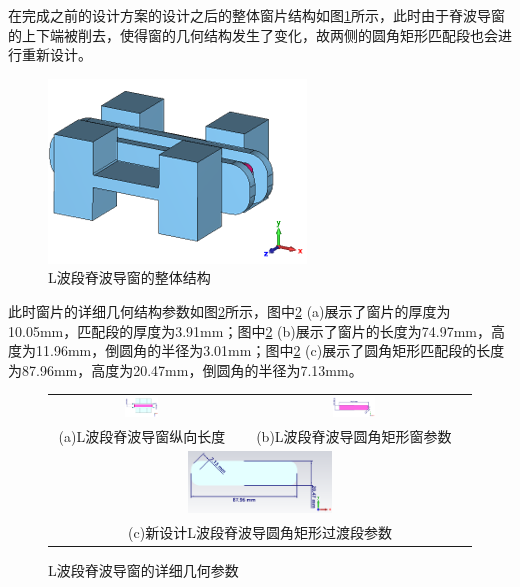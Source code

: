 \documentclass[master]{thesis-uestc}
\begin{document}
在完成之前的设计方案的设计之后的整体窗片结构如图\ref{fig:L波段脊波导窗的整体结构}所示，此时由于脊波导窗的上下端被削去，使得窗的几何结构发生了变化，故两侧的圆角矩形匹配段也会进行重新设计。

\begin{figure}[!htb]
    \centering
    \includegraphics[width=0.3\linewidth]{pic/chapter4/L波段脊波导窗整体结构.png}
    \caption{L波段脊波导窗的整体结构}
    \label{fig:L波段脊波导窗的整体结构}
\end{figure}

此时窗片的详细几何结构参数如图\ref{fig:L波段脊波导窗的详细几何参数}所示，图中\ref{fig:L波段脊波导窗的详细几何参数} (a)展示了窗片的厚度为10.05mm，匹配段的厚度为3.91mm；图中\ref{fig:L波段脊波导窗的详细几何参数} (b)展示了窗片的长度为74.97mm，高度为11.96mm，倒圆角的半径为3.01mm；图中\ref{fig:L波段脊波导窗的详细几何参数} (c)展示了圆角矩形匹配段的长度为87.96mm，高度为20.47mm，倒圆角的半径为7.13mm。
\begin{figure}[!htb]
    \small
    \centering
    \begin{tabular}{@{\ }c@{\ }c}
        \includegraphics[width=0.19\textwidth]{pic/chapter4/L波段脊波导窗纵向长度.png} & 
        \hspace{5pt}
        \includegraphics[width=0.19\textwidth]{pic/chapter4/L波段圆角矩形窗片尺寸.png}     \\
        \mbox{\small (a)L波段脊波导窗纵向长度}                                                                               & 
        \mbox{\small (b)L波段脊波导圆角矩形窗参数}                                                           \\[6bp]
        \multicolumn{2}{c}{\includegraphics[width=0.35\textwidth]{pic/chapter4/L波段过渡段尺寸.png}} \\  %
        \multicolumn{2}{c}{\mbox{\small (c)新设计L波段脊波导圆角矩形过渡段参数}}             
    \end{tabular}
    \caption{L波段脊波导窗的详细几何参数}
    \label{fig:L波段脊波导窗的详细几何参数}
\end{figure}
\end{document}
